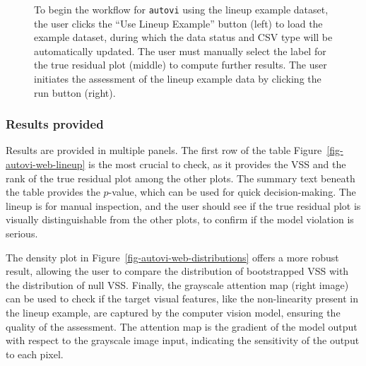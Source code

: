 \documentclass[
doublespace,
  times]{anzsauth}
\begin{document}
\begin{figure}


\caption{\label{fig-autovi-web-setup}To begin the workflow for
\texttt{autovi} using the lineup example dataset, the user clicks the
``Use Lineup Example'' button (left) to load the example dataset, during
which the data status and CSV type will be automatically updated. The
user must manually select the label for the true residual plot (middle)
to compute further results. The user initiates the assessment of the
lineup example data by clicking the run button (right).}

\end{figure}%

\subsubsection{Results provided}\label{results-provided}

Results are provided in multiple panels. The first row of the table
Figure~\ref{fig-autovi-web-lineup} is the most crucial to check, as it
provides the VSS and the rank of the true residual plot among the other
plots. The summary text beneath the table provides the \(p\)-value,
which can be used for quick decision-making. The lineup is for manual
inspection, and the user should see if the true residual plot is
visually distinguishable from the other plots, to confirm if the model
violation is serious.

The density plot in Figure~\ref{fig-autovi-web-distributions} offers a
more robust result, allowing the user to compare the distribution of
bootstrapped VSS with the distribution of null VSS. Finally, the
grayscale attention map (right image) can be used to check if the target
visual features, like the non-linearity present in the lineup example,
are captured by the computer vision model, ensuring the quality of the
assessment. The attention map is the gradient of the model output with
respect to the grayscale image input, indicating the sensitivity of the
output to each pixel.
\end{document}
